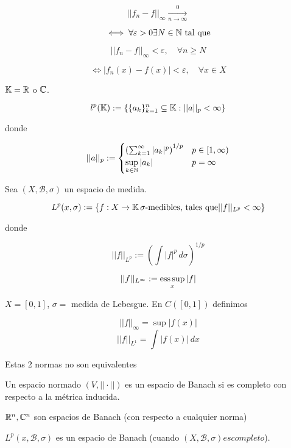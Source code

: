 \documentclass[../Apunte.tex]{subfiles}
\begin{document}
\[||f_n-f||_\infty\xrightarrow[n\to\infty] 0\]

\[\iff \forall \varepsilon>0 \exists N\in\mathbb{N}\text{ tal que}\]

\[||f_n-f||_\infty<\varepsilon,\quad \forall n\geq N\]

\[\iff |f_n(x)-f(x)|<\varepsilon,\quad \forall x\in X\]


\begin{fexample}
    $\mathbb{K}=\mathbb{R}$ o $\mathbb{C}$.

    \[l^p(\mathbb{K}):=\{\{a_k\}_{k=1}^n\subseteq \mathbb{K}: ||a||_p<\infty\}\]

    donde

    \[||a||_p:=\begin{cases}\left(\sum_{k=1}^\infty |a_k|^p\right)^{1/p}&p\in [1,\infty)\\
    \displaystyle\sup_{k\in\mathbb{N}} |a_k|& p=\infty\end{cases}\]
\end{fexample}

Sea $(X,\mathcal{B},\sigma)$ un espacio de medida.

\[L^p(x,\sigma):=\{f:X\to\mathbb{K} \, \sigma\text{-medibles, tales que} ||f||_{L^p}<\infty\}\]

donde 

\[||f||_{L^p}:= \left(\int |f|^p\,d\sigma\right)^{1/p}\]

\[||f||_{L^\infty}:=\operatorname*{ess\,sup}_x |f|\]

\begin{fexample}
    $X=[0,1]$, $\sigma=$ medida de Lebesgue. En $C([0,1])$ definimos

    \[||f||_\infty =\sup |f(x)|\]
    \[||f||_{L^1}=\int |f(x)|\,dx\]

    Estas 2 normas \color{red} no son equivalentes \color{black}
\end{fexample}

\begin{fdefinition}
    Un espacio normado $(V,||\cdot||)$ es un espacio de Banach si es \color{red} completo \color{black} con respecto a la métrica inducida.
\end{fdefinition}

\begin{fexample}
    $\mathbb{R}^n,\mathbb{C}^n$ son espacios de Banach (con respecto a cualquier norma)
    
    $L^p(x,\mathcal{B},\sigma)$ es un espacio de Banach (cuando $(X,\mathcal{B},\sigma) es completo$).
\end{fexample}
\end{document}
